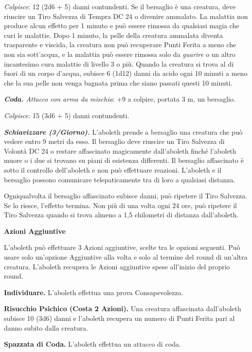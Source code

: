 \begin{multicols}{2}
{\emph{Colpisce}: 12 (2d6 + 5) danni contundenti. Se il bersaglio è una creatura, deve riuscire un Tiro Salvezza di Tempra DC 24 o divenire ammalato. La malattia non produce alcun effetto per 1 minuto e può essere rimossa da qualsiasi magia che curi le malattie. Dopo 1 minuto, la pelle della creatura ammalata diventa trasparente e viscida, la creatura non può recuperare Punti Ferita a meno che non sia sott'acqua, e la malattia può essere rimossa solo da \emph{guarire} o un altro incantesimo cura malattie di livello 3 o più. Quando la creatura si trova al di fuori di un corpo d'acqua, subisce 6 (1d12) danni da acido ogni 10 minuti a meno che la sua pelle non venga bagnata prima che siano passati questi 10 minuti.

\emph{\textbf{Coda.} Attacco con arma da mischia}: +9 a colpire, portata 3 m, un bersaglio.

\emph{Colpisce:} 15 (3d6 + 5) danni contundenti.

\emph{\textbf{Schiavizzare (3/Giorno).}} L'aboleth prende a bersaglio una creatura che può vedere entro 9 metri da esso. Il bersaglio deve riuscire un Tiro Salvezza di Volontà DC 24 o restare affascinato magicamente dall'aboleth finché l'aboleth muore o i due si trovano su piani di esistenza differenti. Il bersaglio affascinato è sotto il controllo dell'aboleth e non può effettuare reazioni. L'aboleth e il bersaglio possono comunicare telepaticamente tra di loro a qualsiasi distanza.

Ogniqualvolta il bersaglio affascinato subisce danni, può ripetere il Tiro Salvezza. Se lo riesce, l'effetto termina. Non più di una volta ogni 24 ore, può ripetere il Tiro Salvezza quando si trova almeno a 1,5 chilometri di distanza dall'aboleth.

\textbf{Azioni Aggiuntive}

L'aboleth può effettuare 3 Azioni aggiuntive, scelte tra le opzioni seguenti. Può usare solo un'opzione Aggiuntive alla volta e solo al termine del round di un'altra creatura. L'aboleth recupera le Azioni aggiuntive spese all'inizio del proprio round.

\textbf{Individuare.} L'aboleth effettua una prova Consapevolezza.

\textbf{Risucchio Psichico (Costa 2 Azioni).} Una creatura affascinata dall'aboleth subisce 10 (3d6) danni e l'aboleth recupera un numero di Punti Ferita pari al danno subito dalla creatura.

\textbf{Spazzata di Coda.} L'aboleth effettua un attacco di coda.

}
\end{multicols}
